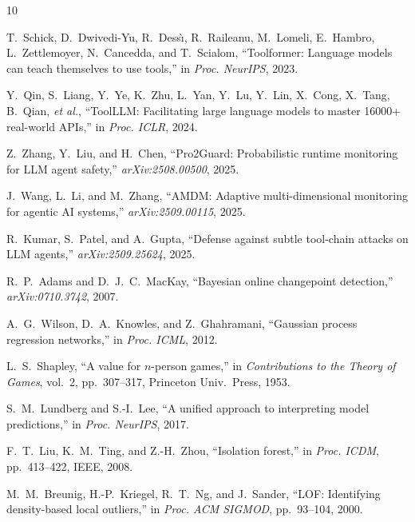 \documentclass[conference,compsoc]{IEEEtran}
\newcommand{\etal}{\textit{et al.}}
\begin{document}
\begin{thebibliography}{10}

T.~Schick, D.~Dwivedi-Yu, R.~Dess{\`\i}, R.~Raileanu, M.~Lomeli, E.~Hambro, L.~Zettlemoyer, N.~Cancedda, and T.~Scialom, ``Toolformer: Language models can teach themselves to use tools,'' in \textit{Proc. NeurIPS}, 2023.

Y.~Qin, S.~Liang, Y.~Ye, K.~Zhu, L.~Yan, Y.~Lu, Y.~Lin, X.~Cong, X.~Tang, B.~Qian, \etal, ``ToolLLM: Facilitating large language models to master 16000+ real-world APIs,'' in \textit{Proc. ICLR}, 2024.

Z.~Zhang, Y.~Liu, and H.~Chen, ``Pro2Guard: Probabilistic runtime monitoring for LLM agent safety,'' \textit{arXiv:2508.00500}, 2025.

J.~Wang, L.~Li, and M.~Zhang, ``AMDM: Adaptive multi-dimensional monitoring for agentic AI systems,'' \textit{arXiv:2509.00115}, 2025.

R.~Kumar, S.~Patel, and A.~Gupta, ``Defense against subtle tool-chain attacks on LLM agents,'' \textit{arXiv:2509.25624}, 2025.

R.~P.~Adams and D.~J.~C.~MacKay, ``Bayesian online changepoint detection,'' \textit{arXiv:0710.3742}, 2007.

A.~G.~Wilson, D.~A.~Knowles, and Z.~Ghahramani, ``Gaussian process regression networks,'' in \textit{Proc. ICML}, 2012.

L.~S.~Shapley, ``A value for $n$-person games,'' in \textit{Contributions to the Theory of Games}, vol.~2, pp.~307--317, Princeton Univ.\ Press, 1953.

S.~M.~Lundberg and S.-I.~Lee, ``A unified approach to interpreting model predictions,'' in \textit{Proc. NeurIPS}, 2017.

F.~T.~Liu, K.~M.~Ting, and Z.-H.~Zhou, ``Isolation forest,'' in \textit{Proc. ICDM}, pp.~413--422, IEEE, 2008.

M.~M.~Breunig, H.-P.~Kriegel, R.~T.~Ng, and J.~Sander, ``LOF: Identifying density-based local outliers,'' in \textit{Proc. ACM SIGMOD}, pp.~93--104, 2000.

\end{thebibliography}
\end{document}
